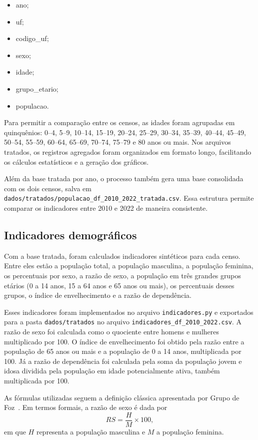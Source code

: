 \documentclass[a4paper,12pt]{article}
\begin{document}
\begin{itemize}
    \item ano;
    \item uf;
    \item codigo\_uf;
    \item sexo;
    \item idade;
    \item grupo\_etario;
    \item populacao.
\end{itemize}

Para permitir a comparação entre os censos, as idades foram agrupadas em quinquênios:
0--4, 5--9, 10--14, 15--19, 20--24, 25--29, 30--34, 35--39, 40--44, 45--49,
50--54, 55--59, 60--64, 65--69, 70--74, 75--79 e 80 anos ou mais. Nos arquivos
tratados, os registros agregados foram organizados em formato longo, facilitando
os cálculos estatísticos e a geração dos gráficos.

Além da base tratada por ano, o processo também gera uma base consolidada com
os dois censos, salva em \texttt{dados/tratados/populacao\_df\_2010\_2022\_tratada.csv}.
Essa estrutura permite comparar os indicadores entre 2010 e 2022 de maneira
consistente.

\subsection{Indicadores demográficos}

Com a base tratada, foram calculados indicadores sintéticos para cada censo.
Entre eles estão a população total, a população masculina, a população feminina,
os percentuais por sexo, a razão de sexo, a população em três grandes grupos
etários (0 a 14 anos, 15 a 64 anos e 65 anos ou mais), os percentuais desses
grupos, o índice de envelhecimento e a razão de dependência.

Esses indicadores foram implementados no arquivo \texttt{indicadores.py} e
exportados para a pasta \texttt{dados/tratados} no arquivo
\texttt{indicadores\_df\_2010\_2022.csv}. A razão de sexo foi calculada como o
quociente entre homens e mulheres multiplicado por 100. O índice de
envelhecimento foi obtido pela razão entre a população de 65 anos ou mais e a
população de 0 a 14 anos, multiplicada por 100. Já a razão de dependência foi
calculada pela soma da população jovem e idosa dividida pela população em idade
potencialmente ativa, também multiplicada por 100.

As fórmulas utilizadas seguem a definição clássica apresentada por Grupo de
Foz~\cite{grupofoz2021metodos}. Em termos formais, a razão de sexo é dada por
\[
RS = \frac{H}{M} \times 100,
\]
em que \(H\) representa a população masculina e \(M\) a população feminina.
\end{document}
